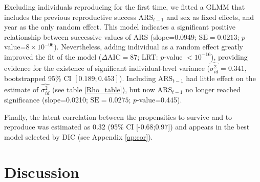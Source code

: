 Excluding individuals reproducing for the first time, we fitted a GLMM that includes the previous reproductive success $\mathrm{ARS}_{t-1}$ and sex as fixed effects, and year as the only random effect. This model indicates a significant positive relationship between successive values of ARS (slope=0.0949; $\mathrm{SE}=0.0213$; $p$-value=$8 \times 10^{-06}$). Nevertheless, adding individual as a random effect greatly improved the fit of the model ($\Delta \mathrm{AIC}=87$; LRT: $p$-value $<10^{-16}$), providing evidence for the existence of significant individual-level variance ($\hat{\sigma_{id}^2}=0.341$, bootstrapped 95\% CI $[0.189;0.453]$). Including $\mathrm{ARS}_{t-1}$ had little effect on the estimate of $\hat{\sigma_{id}^2}$ (see table \ref{Rho_table}), but now $\mathrm{ARS}_{t-1}$ no longer reached significance (slope=0.0210; $\mathrm{SE}=0.0275$; $p$-value=0.445).

Finally, the latent correlation between the propensities to survive and to reproduce was estimated as 0.32 (95\% CI [-0.68;0.97]) and appears in the best model selected by DIC (see Appendix \ref{ap:cor}).


\section{Discussion}
